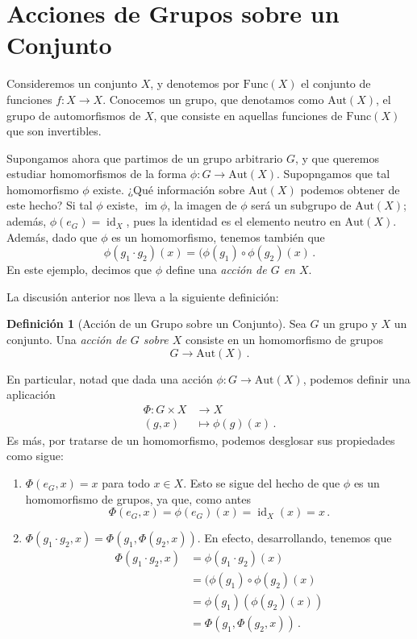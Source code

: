 \documentclass[a4paper,11pt]{amsart}
\DeclareMathOperator{\im}{im}
\DeclareMathOperator{\ide}{id}
\theoremstyle{plain}
\theoremstyle{definition}
\newtheorem{defi}[thm]{Definición}
\theoremstyle{remark}
\begin{document}
\section{Acciones de Grupos sobre un Conjunto}

Consideremos un conjunto $X$, y denotemos por $\text{Func}(X)$ el conjunto de funciones $f \colon X \to X$. Conocemos un grupo, que denotamos como $\text{Aut}(X)$, el grupo de automorfismos de $X$, que consiste en aquellas funciones de $\text{Func}(X)$ que son invertibles. 

Supongamos ahora que partimos de un grupo arbitrario $G$, y que queremos estudiar homomorfismos de la forma $\phi \colon G \to \text{Aut}(X)$. Supopngamos que tal homomorfismo $\phi$ existe. ¿Qué información sobre $\text{Aut}(X)$ podemos obtener de este hecho? Si tal $\phi$ existe, $\im \phi$, la imagen de $\phi$ será un subgrupo de $\text{Aut}(X)$; además, $\phi(e_G) = \ide_X$, pues la identidad es el elemento neutro en $\text{Aut}(X)$. Además, dado que $\phi$ es un homomorfismo, tenemos también que 
\[ \phi(g_1 \cdot g_2)(x) = (\phi(g_1) \circ \phi(g_2)(x) \, . \]
En este ejemplo, decimos que $\phi$ define una \textit{acción de $G$ en $X$}. 

La discusión anterior nos lleva a la siguiente definición:

\begin{defi}[Acción de un Grupo sobre un Conjunto]
Sea $G$ un grupo y $X$ un conjunto. Una \textit{acción de $G$ sobre $X$} consiste en un homomorfismo de grupos 
\[ G \to \text{Aut}(X) \, .\]
\end{defi}

En particular, notad que dada una acción $\phi \colon G \to \text{Aut}(X)$, podemos definir una aplicación 
\begin{align*}
   \Phi \colon  G \times X & \to X\\
    (g, x) & \mapsto \phi(g)(x) \, .
\end{align*}
Es más, por tratarse de un homomorfismo, podemos desglosar sus propiedades como sigue: 
\begin{enumerate}[label = \arabic*)]
    \item $\Phi(e_G, x) = x$ para todo $x \in X$. Esto se sigue del hecho de que $\phi$ es un homomorfismo de grupos, ya que, como antes 
    \[ \Phi(e_G, x) = \phi(e_G)(x) = \ide_X(x) = x \, . \]
    \item $\Phi(g_1 \cdot g_2, x) = \Phi(g_1, \Phi(g_2, x))$. En efecto, desarrollando, tenemos que 
    \begin{align*}
        \Phi(g_1 \cdot g_2, x) & = \phi(g_1\cdot g_2)(x) \\
        & = (\phi(g_1) \circ \phi(g_2)(x) \\
        & = \phi(g_1)(\phi(g_2)(x))\\
        & = \Phi(g_1, \Phi(g_2, x)) \, .
    \end{align*}
\end{enumerate}
\end{document}

